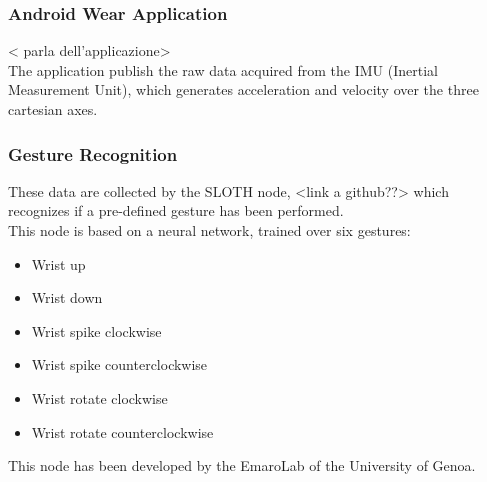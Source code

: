 \documentclass[12pt]{article}
\begin{document}
{\subsubsection{Android Wear Application}
< parla dell'applicazione> \\
The application publish the raw data acquired from the IMU (Inertial Measurement Unit), which generates acceleration and velocity over the three cartesian axes. \\

\subsubsection{Gesture Recognition}
These data are collected by the SLOTH node, <link a github??> which recognizes if a pre-defined gesture has been performed. \\This node is based on a neural network, trained over six gestures:
\begin{itemize}
\item Wrist up
\item Wrist down
\item Wrist spike clockwise
\item Wrist spike counterclockwise
\item Wrist rotate clockwise
\item Wrist rotate counterclockwise
\end{itemize}
This node has been developed by the EmaroLab of the University of Genoa.

}
\end{document}
